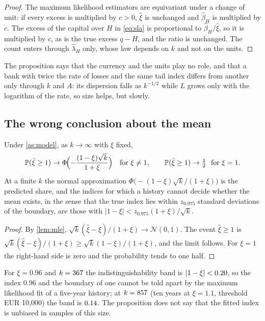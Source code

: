 \begin{proof}
The maximum likelihood estimators are equivariant under a change of unit: if every excess is multiplied by $c>0$, $\hat\xi$ is unchanged and $\hat\beta_H$ is multiplied by $c$. The excess of the capital over $H$ in \cref{eq:sla} is proportional to $\hat\beta_H/\hat\xi$, so it is multiplied by $c$, as is the true excess $q-H$, and the ratio is unchanged. The count enters through $\hat\lambda_H$ only, whose law depends on $k$ and not on the units.
\end{proof}

The proposition says that the currency and the units play no role, and that a bank with twice the rate of losses and the same tail index differs from another only through $k$ and $A$: its dispersion falls as $k^{-1/2}$ while $L$ grows only with the logarithm of the rate, so size helps, but slowly.

\subsection{The wrong conclusion about the mean}
\label{sec:theory-mean}

\begin{proposition}
\label{prop:mean}
Under \cref{as:model}, as $k\to\infty$ with $\xi$ fixed,
\begin{equation}
\mathbb{P}(\hat\xi\ge1)\to\Phi\!\Bigl(-\frac{(1-\xi)\sqrt k}{1+\xi}\Bigr)\quad\text{for }\xi\neq1,\qquad\mathbb{P}(\hat\xi\ge1)\to\tfrac12\ \text{ for }\xi=1 .
\label{eq:misclassification}
\end{equation}
At a finite $k$ the normal approximation $\Phi\bigl(-(1-\xi)\sqrt k/(1+\xi)\bigr)$ is the predicted share, and the indices for which a history cannot decide whether the mean exists, in the sense that the true index lies within $z_{0.975}$ standard deviations of the boundary, are those with $|1-\xi|<z_{0.975}(1+\xi)/\sqrt k$.
\end{proposition}

\begin{proof}
By \cref{lem:mle}, $\sqrt k(\hat\xi-\xi)/(1+\xi)\to\mathcal N(0,1)$. The event $\hat\xi\ge1$ is $\sqrt k(\hat\xi-\xi)/(1+\xi)\ge\sqrt k(1-\xi)/(1+\xi)$, and the limit follows. For $\xi=1$ the right-hand side is zero and the probability tends to one half.
\end{proof}

For $\xi=0.96$ and $k=367{}$ the indistinguishability band is $|1-\xi|<0.20{}$, so the index $0.96$ and the boundary of one cannot be told apart by the maximum likelihood fit of a five-year history; at $k=857{}$ (ten years at $\xi=1.1$, threshold EUR 10,000) the band is $0.14{}$. The proposition does not say that the fitted index is unbiased in samples of this size.

